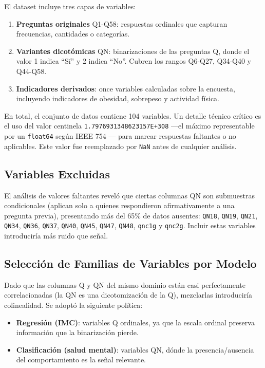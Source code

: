 \documentclass[conference]{IEEEtran}
\begin{document}
El dataset incluye tres capas de variables:
\begin{enumerate}
  \item \textbf{Preguntas originales} Q1-Q58: respuestas ordinales que capturan frecuencias, cantidades o categorías.
  \item \textbf{Variantes dicotómicas} QN: binarizaciones de las preguntas Q, donde el valor 1 indica ``Sí'' y 2 indica ``No''. Cubren los rangos Q6-Q27, Q34-Q40 y Q44-Q58.
  \item \textbf{Indicadores derivados}: once variables calculadas sobre la encuesta, incluyendo indicadores de obesidad, sobrepeso y actividad física.
\end{enumerate}

En total, el conjunto de datos contiene 104 variables. Un detalle técnico crítico es el uso del valor centinela \texttt{1.7976931348623157E+308} ---el máximo representable por un \texttt{float64} según IEEE 754 \cite{ieee754}--- para marcar respuestas faltantes o no aplicables. Este valor fue reemplazado por \texttt{NaN} antes de cualquier análisis.

\subsection{Variables Excluidas}

El análisis de valores faltantes reveló que ciertas columnas QN son submuestras condicionales (aplican solo a quienes respondieron afirmativamente a una pregunta previa), presentando más del 65\% de datos ausentes: \texttt{QN18}, \texttt{QN19}, \texttt{QN21}, \texttt{QN34}, \texttt{QN36}, \texttt{QN37}, \texttt{QN40}, \texttt{QN45}, \texttt{QN47}, \texttt{QN48}, \texttt{qnc1g} y \texttt{qnc2g}. Incluir estas variables introduciría más ruido que señal.

\subsection{Selección de Familias de Variables por Modelo}

Dado que las columnas Q y QN del mismo dominio están casi perfectamente correlacionadas (la QN es una dicotomización de la Q), mezclarlas introduciría colinealidad. Se adoptó la siguiente política:

\begin{itemize}
  \item \textbf{Regresión (IMC)}: variables Q ordinales, ya que la escala ordinal preserva información que la binarización pierde.
  \item \textbf{Clasificación (salud mental)}: variables QN, dónde la presencia/ausencia del comportamiento es la señal relevante.
\end{itemize}
\end{document}
